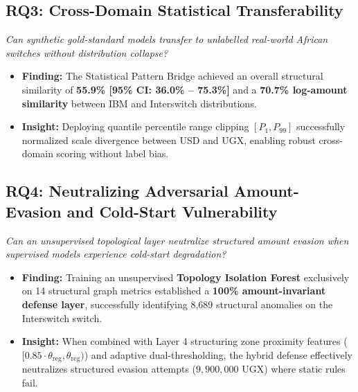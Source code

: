 \subsection{RQ3: Cross-Domain Statistical Transferability}
\textit{Can synthetic gold-standard models transfer to unlabelled real-world African switches without distribution collapse?}
\begin{itemize}
    \item \textbf{Finding:} The Statistical Pattern Bridge achieved an overall structural similarity of \textbf{55.9\% [95\% CI: 36.0\% -- 75.3\%]} and a \textbf{70.7\% log-amount similarity} between IBM and Interswitch distributions.
    \item \textbf{Insight:} Deploying quantile percentile range clipping $[P_1, P_{99}]$ successfully normalized scale divergence between USD and UGX, enabling robust cross-domain scoring without label bias.
\end{itemize}

\subsection{RQ4: Neutralizing Adversarial Amount-Evasion and Cold-Start Vulnerability}
\textit{Can an unsupervised topological layer neutralize structured amount evasion when supervised models experience cold-start degradation?}
\begin{itemize}
    \item \textbf{Finding:} Training an unsupervised \textbf{Topology Isolation Forest} exclusively on 14 structural graph metrics established a \textbf{100\% amount-invariant defense layer}, successfully identifying 8,689 structural anomalies on the Interswitch switch.
    \item \textbf{Insight:} When combined with Layer 4 structuring zone proximity features ($[0.85 \cdot \theta_{\text{reg}}, \theta_{\text{reg}})$) and adaptive dual-thresholding, the hybrid defense effectively neutralizes structured evasion attempts ($9,900,000\text{ UGX}$) where static rules fail.
\end{itemize}

